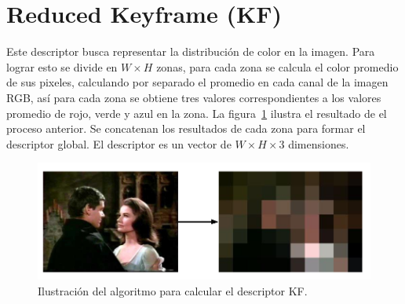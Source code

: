 \section{Reduced Keyframe (KF)}
Este descriptor busca representar la distribución de color en la imagen. Para lograr esto se divide en $W \times H$ zonas, para cada zona se calcula el color promedio de sus pixeles, calculando por separado el promedio en cada canal de la imagen RGB, así para cada zona se obtiene tres valores correspondientes a los valores promedio de rojo, verde y azul en la zona. La figura~\ref{descriptor_kf} ilustra el resultado de el proceso anterior.  Se concatenan los resultados de cada zona para formar el descriptor global. El descriptor es un vector de $W \times H \times 3$ dimensiones.
    \begin{figure}[!h]
		\centering
		\includegraphics[scale=0.4]{imagenes/cap3/descriptor_kf.png}
		\caption{Ilustración del algoritmo para calcular el descriptor KF.}
		\label{descriptor_kf}
	\end{figure}

